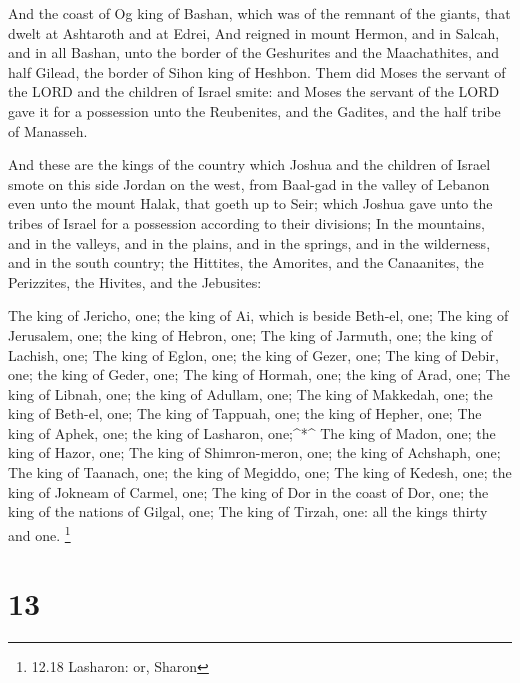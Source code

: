  And the coast of Og king of Bashan, which was of the
remnant of the giants, that dwelt at Ashtaroth and at Edrei,
 And reigned in mount Hermon, and in Salcah, and in all
Bashan, unto the border of the Geshurites and the Maachathites, and half
Gilead, the border of Sihon king of Heshbon.  Them did Moses
the servant of the LORD and the children of Israel smite: and Moses the
servant of the LORD gave it for a possession unto the Reubenites, and
the Gadites, and the half tribe of Manasseh.

 And these are the kings of the country which Joshua and the
children of Israel smote on this side Jordan on the west, from Baal-gad
in the valley of Lebanon even unto the mount Halak, that goeth up to
Seir; which Joshua gave unto the tribes of Israel for a possession
according to their divisions;  In the mountains, and in the
valleys, and in the plains, and in the springs, and in the wilderness,
and in the south country; the Hittites, the Amorites, and the
Canaanites, the Perizzites, the Hivites, and the Jebusites:

 The king of Jericho, one; the king of Ai, which is beside
Beth-el, one;  The king of Jerusalem, one; the king of
Hebron, one;  The king of Jarmuth, one; the king of
Lachish, one;  The king of Eglon, one; the king of Gezer,
one;  The king of Debir, one; the king of Geder, one;
 The king of Hormah, one; the king of Arad, one;
 The king of Libnah, one; the king of Adullam, one;
 The king of Makkedah, one; the king of Beth-el, one;
 The king of Tappuah, one; the king of Hepher, one;
 The king of Aphek, one; the king of Lasharon,
one;\^{}*\^{}  The king of Madon, one; the king of Hazor,
one;  The king of Shimron-meron, one; the king of Achshaph,
one;  The king of Taanach, one; the king of Megiddo, one;
 The king of Kedesh, one; the king of Jokneam of Carmel,
one;  The king of Dor in the coast of Dor, one; the king of
the nations of Gilgal, one;  The king of Tirzah, one: all
the kings thirty and one. \footnote{12.18 Lasharon: or, Sharon}

\hypertarget{section-12}{%
\section{13}\label{section-12}}

